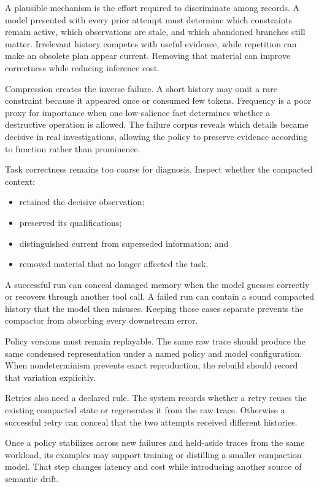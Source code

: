 A plausible mechanism is the effort required to discriminate among records. A model presented with every prior attempt must determine which constraints remain active, which observations are stale, and which abandoned branches still matter. Irrelevant history competes with useful evidence, while repetition can make an obsolete plan appear current. Removing that material can improve correctness while reducing inference cost.

Compression creates the inverse failure. A short history may omit a rare constraint because it appeared once or consumed few tokens. Frequency is a poor proxy for importance when one low-salience fact determines whether a destructive operation is allowed. The failure corpus reveals which details became decisive in real investigations, allowing the policy to preserve evidence according to function rather than prominence.


Task correctness remains too coarse for diagnosis. Inspect whether the compacted context:

\begin{itemize}
\tightlist
\item
  retained the decisive observation;
\item
  preserved its qualifications;
\item
  distinguished current from superseded information; and
\item
  removed material that no longer affected the task.
\end{itemize}

A successful run can conceal damaged memory when the model guesses correctly or recovers through another tool call. A failed run can contain a sound compacted history that the model then misuses. Keeping those cases separate prevents the compactor from absorbing every downstream error.

Policy versions must remain replayable. The same raw trace should produce the same condensed representation under a named policy and model configuration. When nondeterminism prevents exact reproduction, the rebuild should record that variation explicitly.

Retries also need a declared rule. The system records whether a retry reuses the existing compacted state or regenerates it from the raw trace. Otherwise a successful retry can conceal that the two attempts received different histories.

Once a policy stabilizes across new failures and held-aside traces from the same workload, its examples may support training or distilling a smaller compaction model. That step changes latency and cost while introducing another source of semantic drift.

